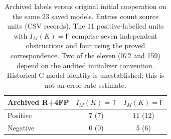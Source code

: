 \begin{table}[t]
\centering
\caption{Archived labels versus original initial cooperation on the
same 23 saved models. Entries count source units (CSV records).
The 11 positive-labelled units with $I_M(K)=\mathsf{F}$ comprise seven
independent obstructions and four using the proved correspondence.
Two of the eleven (072 and 159) depend on the audited initializer convention.
Historical C-model identity is unestablished; this is not an error-rate estimate.}
\label{tab:published-k-initial}
\small
\setlength{\tabcolsep}{8pt}
\begin{tabular}{@{}lcc@{}}
\toprule
Archived R+4FP & $I_M(K)=\mathsf{T}$ & $I_M(K)=\mathsf{F}$\\
\midrule
Positive & 7 (7) & 11 (12)\\
Negative & 0 (0) & 5 (6)\\
\bottomrule
\end{tabular}
\end{table}
